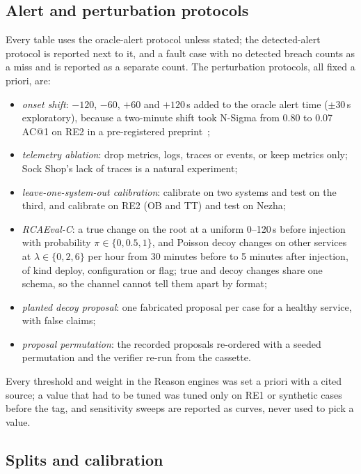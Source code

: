\subsection{Alert and perturbation protocols}
\label{sec:protocols}

Every table uses the oracle-alert protocol unless stated; the detected-alert protocol is reported next to it, and a fault case with no detected breach counts as a miss and is reported as a separate count.
The perturbation protocols, all fixed a priori, are:
\begin{itemize}
\item \emph{onset shift}: $-120$, $-60$, $+60$ and $+120$\,s added to the oracle alert time ($\pm 30$\,s exploratory), because a two-minute shift took N-Sigma from 0.80 to 0.07 AC@1 on RE2 in a pre-registered preprint~\cite{hussain2026prereg};
\item \emph{telemetry ablation}: drop metrics, logs, traces or events, or keep metrics only; Sock Shop's lack of traces is a natural experiment;
\item \emph{leave-one-system-out calibration}: calibrate on two systems and test on the third, and calibrate on RE2 (OB and TT) and test on Nezha;
\item \emph{RCAEval-C}: a true change on the root at a uniform 0--120\,s before injection with probability $\pi \in \{0, 0.5, 1\}$, and Poisson decoy changes on other services at $\lambda \in \{0, 2, 6\}$ per hour from 30 minutes before to 5 minutes after injection, of kind deploy, configuration or flag; true and decoy changes share one schema, so the channel cannot tell them apart by format;
\item \emph{planted decoy proposal}: one fabricated proposal per case for a healthy service, with false claims;
\item \emph{proposal permutation}: the recorded proposals re-ordered with a seeded permutation and the verifier re-run from the cassette.
\end{itemize}
Every threshold and weight in the Reason engines was set a priori with a cited source; a value that had to be tuned was tuned only on RE1 or synthetic cases before the tag, and sensitivity sweeps are reported as curves, never used to pick a value.

\subsection{Splits and calibration}
\label{sec:splits}

